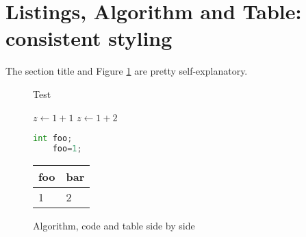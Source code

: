 \section{Listings, Algorithm and Table: consistent styling}
The section title and Figure \ref{fig:figure} are pretty self-explanatory.\Blindtext
\begin{figure}\centering
\begin{minipage}[t]{.3\textwidth}
\begin{algorithm}[H]
    \caption{Test}
    \begin{algorithmic}[1]
        \State $z\gets 1+1$
        \State $z\gets 1+2$
    \end{algorithmic}
\end{algorithm}
\end{minipage}\hfill
\begin{minipage}[t]{.3\textwidth}%
    \vspace{.7em}
    \begin{lstlisting}[language=Python,caption=ex]
    int foo;
    foo=1;
    \end{lstlisting}
\end{minipage}\hfill%
\begin{minipage}[t]{.3\textwidth}
\begin{table}[H]
    \begin{tabular}{ll}
        \toprule
        foo & bar \\
        \midrule 
        1 & 2 \\
        \bottomrule
    \end{tabular}
\end{table}
\end{minipage}
\caption{Algorithm, code and table side by side}\label{fig:figure}
\end{figure}